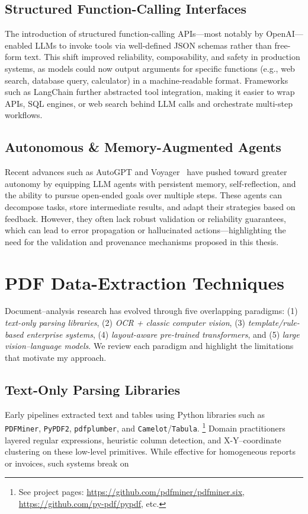 \subsection{Structured Function-Calling Interfaces}
The introduction of structured function-calling APIs—most notably by OpenAI—enabled LLMs to invoke tools via well-defined JSON schemas rather than free-form text. This shift improved reliability, composability, and safety in production systems, as models could now output arguments for specific functions (e.g., web search, database query, calculator) in a machine-readable format. Frameworks such as LangChain further abstracted tool integration, making it easier to wrap APIs, SQL engines, or web search behind LLM calls and orchestrate multi-step workflows.

\subsection{Autonomous \& Memory-Augmented Agents}
Recent advances such as AutoGPT and Voyager~\cite{wang2023voyager} have pushed toward greater autonomy by equipping LLM agents with persistent memory, self-reflection, and the ability to pursue open-ended goals over multiple steps. These agents can decompose tasks, store intermediate results, and adapt their strategies based on feedback. However, they often lack robust validation or reliability guarantees, which can lead to error propagation or hallucinated actions—highlighting the need for the validation and provenance mechanisms proposed in this thesis.

\section{PDF Data-Extraction Techniques}
Document–analysis research has evolved through five overlapping paradigms:  
(1) \emph{text-only parsing libraries},  
(2) \emph{OCR + classic computer vision},  
(3) \emph{template/rule-based enterprise systems},  
(4) \emph{layout-aware pre-trained transformers}, and  
(5) \emph{large vision--language models}.  
We review each paradigm and highlight the limitations that motivate my approach.

\subsection{Text-Only Parsing Libraries}
Early pipelines extracted text and tables using Python libraries such as
\texttt{PDFMiner}, \texttt{PyPDF2}, \texttt{pdfplumber}, and
\texttt{Camelot}/\texttt{Tabula}.%
\footnote{See project pages: \url{https://github.com/pdfminer/pdfminer.six},
\url{https://github.com/py-pdf/pypdf}, etc.}  
Domain practitioners layered regular expressions, heuristic column detection,
and X-Y–coordinate clustering on these low-level primitives.
While effective for homogeneous reports or invoices, such systems break on

